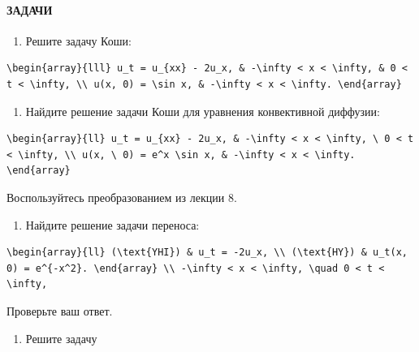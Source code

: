 \documentclass[
  ukrainian,
]{article}
\providecommand{\tightlist}{%
  \setlength{\itemsep}{0pt}\setlength{\parskip}{0pt}}
\begin{document}
\paragraph{ЗАДАЧИ}\label{ux437ux430ux434ux430ux447ux438}

\begin{enumerate}
\def\labelenumi{\arabic{enumi}.}
\tightlist
\item
  Решите задачу Коши:
\end{enumerate}

\begin{verbatim}
\begin{array}{lll} u_t = u_{xx} - 2u_x, & -\infty < x < \infty, & 0 < t < \infty, \\ u(x, 0) = \sin x, & -\infty < x < \infty. \end{array}
\end{verbatim}

\begin{enumerate}
\def\labelenumi{\arabic{enumi}.}
\setcounter{enumi}{1}
\tightlist
\item
  Найдите решение задачи Коши для уравнения конвективной диффузии:
\end{enumerate}

\begin{verbatim}
\begin{array}{ll} u_t = u_{xx} - 2u_x, & -\infty < x < \infty, \ 0 < t < \infty, \\ u(x, \ 0) = e^x \sin x, & -\infty < x < \infty. \end{array}
\end{verbatim}

Воспользуйтесь преобразованием из лекции 8.

\begin{enumerate}
\def\labelenumi{\arabic{enumi}.}
\setcounter{enumi}{2}
\tightlist
\item
  Найдите решение задачи переноса:
\end{enumerate}

\begin{verbatim}
\begin{array}{ll} (\text{YHI}) & u_t = -2u_x, \\ (\text{HY}) & u_t(x, 0) = e^{-x^2}. \end{array} \\ -\infty < x < \infty, \quad 0 < t < \infty,
\end{verbatim}

Проверьте ваш ответ.

\begin{enumerate}
\def\labelenumi{\arabic{enumi}.}
\setcounter{enumi}{3}
\tightlist
\item
  Решите задачу
\end{enumerate}
\end{document}

